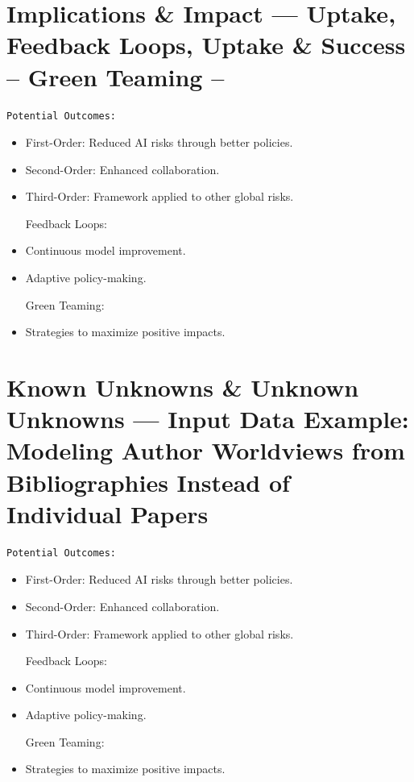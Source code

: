 \documentclass[
  letterpaper,
]{book}
\begin{document}
\section{Implications \& Impact --- Uptake, Feedback Loops, Uptake \&
Success -- Green Teaming
--}\label{implications-impact-uptake-feedback-loops-uptake-success-green-teaming}

\begin{verbatim}
Potential Outcomes:
\end{verbatim}

\begin{itemize}
\item
  First-Order: Reduced AI risks through better policies.\\
\item
  Second-Order: Enhanced collaboration.\\
\item
  Third-Order: Framework applied to other global risks.

  Feedback Loops:
\item
  Continuous model improvement.\\
\item
  Adaptive policy-making.

  Green Teaming:
\item
  Strategies to maximize positive impacts.
\end{itemize}

\section{Known Unknowns \& Unknown Unknowns --- Input Data Example:
Modeling Author Worldviews from Bibliographies Instead of Individual
Papers}\label{known-unknowns-unknown-unknowns-input-data-example-modeling-author-worldviews-from-bibliographies-instead-of-individual-papers}

\begin{verbatim}
Potential Outcomes:
\end{verbatim}

\begin{itemize}
\item
  First-Order: Reduced AI risks through better policies.\\
\item
  Second-Order: Enhanced collaboration.\\
\item
  Third-Order: Framework applied to other global risks.

  Feedback Loops:
\item
  Continuous model improvement.\\
\item
  Adaptive policy-making.

  Green Teaming:
\item
  Strategies to maximize positive impacts.
\end{itemize}
\end{document}
